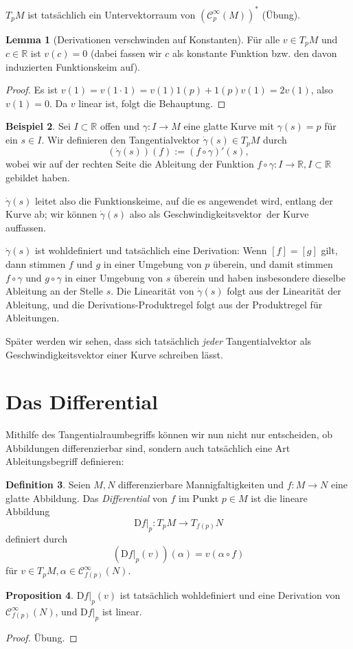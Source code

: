 \documentclass[a4paper]{scrreprt}
\numberwithin{equation}{chapter}
\newcommand{\DD}{\mathrm{D}}
\newcommand{\sC}{\mathcal{C}^{\infty}}
\theoremstyle{definition}
\newtheorem{defn}{Definition}[section]
\newtheorem{lemma}[defn]{Lemma}
\newtheorem{prop}[defn]{Proposition}
\newtheorem{bsp}[defn]{Beispiel}
\newcommand{\bewUeb}{\begin{proof}Übung.\end{proof}}
\begin{document}
$T_pM$ ist tatsächlich ein Untervektorraum von $(\sC_p(M))^*$ (Übung).

\begin{lemma}[Derivationen verschwinden auf Konstanten]
	Für alle $v \in T_pM$ und $c \in \mathbb R$ ist $v(c) = 0$ (dabei fassen wir $c$ als konstante Funktion bzw. den davon induzierten Funktionskeim auf).
	
	\begin{proof}
		Es ist $v(1) = v(1\cdot 1) = v(1) 1(p) + 1(p) v(1) = 2 v(1)$, also $v(1) = 0$. Da $v$ linear ist, folgt die Behauptung.
	\end{proof}
\end{lemma}

\begin{bsp} \label{bsp:kurve_geschw}
	Sei $I\subset\mathbb R$ offen und $\gamma\colon I \to M$ eine glatte Kurve mit $\gamma(s) = p$ für ein $s \in I$. Wir definieren den Tangentialvektor $\dot\gamma(s) \in T_pM$ durch \[(\dot\gamma(s))(f) := (f\circ\gamma)'(s),\] wobei wir auf der rechten Seite die Ableitung der Funktion $f\circ\gamma \colon I \to \mathbb R, I \subset \mathbb R$ gebildet haben.

	$\dot\gamma(s)$ leitet also die Funktionskeime, auf die es angewendet wird, entlang der Kurve ab; wir können $\dot\gamma(s)$ also als \glqq Geschwindigkeitsvektor\grqq\ der Kurve auffassen.

	$\dot\gamma(s)$ ist wohldefiniert und tatsächlich eine Derivation: Wenn $[f] = [g]$ gilt, dann stimmen $f$ und $g$ in einer Umgebung von $p$ überein, und damit stimmen $f\circ\gamma$ und $g\circ\gamma$ in einer Umgebung von $s$ überein und haben insbesondere dieselbe Ableitung an der Stelle $s$. Die Linearität von $\dot\gamma(s)$ folgt aus der Linearität der Ableitung, und die Derivations-Produktregel folgt aus der Produktregel für Ableitungen.
\end{bsp}

Später werden wir sehen, dass sich tatsächlich \emph{jeder} Tangentialvektor als Geschwindigkeitsvektor einer Kurve schreiben lässt.

\section{Das Differential}

Mithilfe des Tangentialraumbegriffs können wir nun nicht nur entscheiden, ob Abbildungen differenzierbar sind, sondern auch tatsächlich eine Art Ableitungsbegriff definieren:
\begin{defn}
	Seien $M,N$ differenzierbare Mannigfaltigkeiten und $f\colon M \to N$ eine glatte Abbildung. Das \emph{Differential} von $f$ im Punkt $p\in M$ ist die lineare Abbildung
	\[\left.\DD f\right|_p \colon T_pM \to T_{f(p)}N\]
	definiert durch
	\[\left(\left.\DD f\right|_p(v)\right)(\alpha) = v (\alpha\circ f)\]
	für $v\in T_pM, \alpha \in \sC_{f(p)}(N)$.
\end{defn}
\begin{prop}
	$\left.\DD f\right|_p(v)$ ist tatsächlich wohldefiniert und eine Derivation von $\sC_{f(p)}(N)$, und $\left.\DD f\right|_p$ ist linear. \bewUeb
\end{prop}
\end{document}
